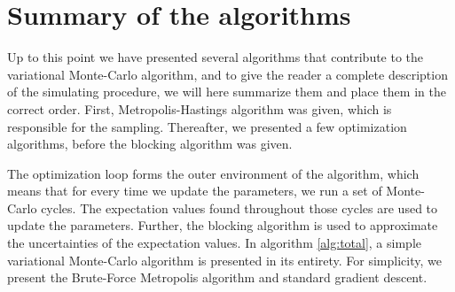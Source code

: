 \section{Summary of the algorithms} \label{sec:algorithmsummary}
Up to this point we have presented several algorithms that contribute to the variational Monte-Carlo algorithm, and to give the reader a complete description of the simulating procedure, we will here summarize them and place them in the correct order. First, Metropolis-Hastings algorithm was given, which is responsible for the sampling. Thereafter, we presented a few optimization algorithms, before the blocking algorithm was given. 

The optimization loop forms the outer environment of the algorithm, which means that for every time we update the parameters, we run a set of Monte-Carlo cycles. The expectation values found throughout those cycles are used to update the parameters. Further, the blocking algorithm is used to approximate the uncertainties of the expectation values. In algorithm \ref{alg:total}, a simple variational Monte-Carlo algorithm is presented in its entirety. For simplicity, we present the Brute-Force Metropolis algorithm and standard gradient descent. 


